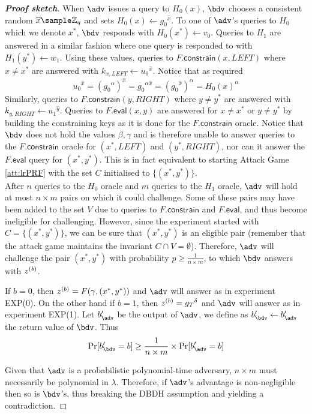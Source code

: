 \begin{proof}[\textbf{Proof sketch}]
			When $\adv$ issues a query to $H_0(x)$, $\bdv$ chooses a consistent random $\widehat x \sample \mathbb{Z}_q$ and sets $H_0(x) \leftarrow {g_0}^{\widehat x}$. To one of $\adv$'s queries to $H_0$ which we denote $x^*$, $\bdv$ responds with $H_0(x^*) \leftarrow v_0$. Queries to $H_1$ are answered in a similar fashion where one query is responded to with $H_1(y^*) \leftarrow w_1$. Using these values, queries to $F.\mathsf{constrain}(x,LEFT)$ where $x\neq x^*$ are answered with $k_{x,LEFT} \leftarrow  {u_0}^{\widehat x}$. Notice that as required
				$$ {u_0}^{\widehat x} = ({g_0}^\alpha)^{\widehat x} = {g_0}^{\alpha \widehat x} = ({g_0}^{\widehat x})^{\alpha} = H_0(x)^\alpha$$
			Similarly, queries to $F.\mathsf{constrain}(y,RIGHT)$ where $y\neq y^*$ are answered with $k_{y,RIGHT} \leftarrow  {u_1}^{\widehat y}$. Queries to $F.\mathsf{eval}(x,y)$ are answered for $x \neq x^*$ or $y \neq y^*$ by building the constraining keys as it is done for the $F.\mathsf{constrain}$ oracle. Notice that $\bdv$ does not hold the values $\beta,\gamma$ and is therefore unable to answer queries to the $F.\mathsf{constrain}$ oracle for $(x^*, LEFT)$ and $(y^*, RIGHT)$, nor can it answer the $F.\mathsf{eval}$ query for $(x^*,y^*)$. This is in fact equivalent to starting Attack Game \autoref{att:lrPRF} with the set $C$ initialised to $\{(x^*,y^*)\}$. \\
			
			After $n$ queries to the $H_0$ oracle and $m$ queries to the $H_1$ oracle, $\adv$ will hold at most $n \times m$ pairs on which it could challenge.	 Some of these pairs may have been added to the set $V$ due to queries to $F.\mathsf{constrain}$ and $F.\mathsf{eval}$, and thus become ineligible for challenging. However, since the experiment started with $C = \{(x^*,y^*)\}$, we can be sure that $(x^*,y^*)$ is an eligible pair (remember that the attack game maintains the invariant $C \cap V = \emptyset$). Therefore, $\adv$ will challenge the pair $(x^*,y^*)$ with probability $p \geq \frac{1}{n\times m}$, to which $\bdv$ answers with $z^{(b)}$. 
			
			If $b=0$, then $z^{(b)} = F(\gamma, (x^*, y^*))$ and $\adv$ will answer as in experiment EXP(0). On the other hand if $b=1$, then $z^{(b)} = {g_T}^{\delta}$ and $\adv$ will answer as in experiment EXP(1). Let $b'_\adv$ be the output of $\adv$, we define as $b'_\bdv \leftarrow b'_\adv$ the return value of $\bdv$. Thus
			\begin{equation}
				\Pr[b'_\bdv = b] \geq \frac{1}{n \times m} \times \Pr[b'_\adv = b]
			\end{equation}
			
			Given that $\adv$ is a probabilistic polynomial-time adversary, $n \times m$ must necessarily be polynomial in $\lambda$. Therefore, if $\adv$'s advantage is non-negligible then so is $\bdv$'s, thus breaking the DBDH assumption and yielding a contradiction.
		\end{proof}
		
